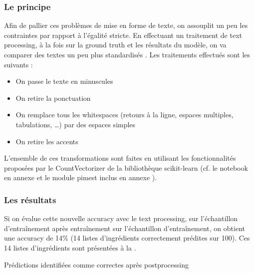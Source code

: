                 \subsubsection{Le principe}
                Afin de pallier ces problèmes de mise en forme de texte, on assouplit un peu les contraintes par rapport à l'égalité stricte.
                En effectuant un traitement de text processing, à la fois sur la ground truth et les résultats du modèle, on va comparer des textes un peu plus \og standardisés \fg.
                Les traitements effectués sont les suivants :
                \begin{itemize}
                    \item On passe le texte en minuscules
                    \item On retire la ponctuation
                    \item On remplace tous les \og whitespaces \fg (retours à la ligne, espaces multiples, tabulations, \dots) par des espaces simples
                    \item On retire les accents
                \end{itemize}
                L'ensemble de ces transformations sont faites en utilisant les fonctionnalités proposées par le CountVectorizer de la bibliothèque scikit-learn (cf. le notebook en annexe  et le module pimest inclus en annexe ).

                \subsubsection{Les résultats}

                Si on évalue cette nouvelle accuracy avec le text processing, sur l'échantillon d'entraînement après entraînement sur l'échantillon d'entraînement, on obtient une accuracy de 14\% (14 listes d'ingrédients correctement prédites sur 100).
                Ces 14 listes d'ingrédients sont présentées à la .

               {\renewcommand{\arraystretch}{1.5}%
                \begin{table}
                    \begin{spacing}{1.0}
                    \begin{center}
                    {\scriptsize
                    
                    }
                    \caption{Prédictions identifiées comme correctes après postprocessing}
                    \label{tbl:GT_postprocessed_corrects}
                    \end{center}
                    \end{spacing}
                \end{table}
                }

